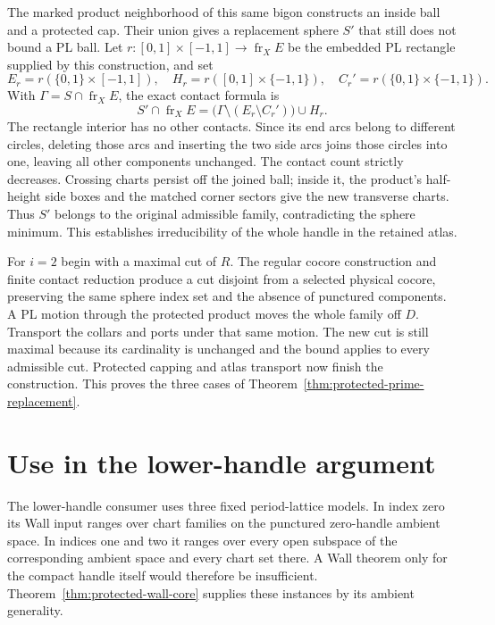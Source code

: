 The marked product neighborhood of this same bigon constructs an inside
ball and a protected cap. Their union gives a replacement sphere $S'$
that still does not bound a PL ball. Let $r:[0,1]\times[-1,1]\to
\operatorname{fr}_X E$ be the embedded PL rectangle supplied by this
construction, and set
\[
 E_r=r(\{0,1\}\times[-1,1]),\quad
 H_r=r([0,1]\times\{-1,1\}),\quad
 C_r'=r(\{0,1\}\times\{-1,1\}).
\]
With $\Gamma=S\cap\operatorname{fr}_X E$, the exact contact formula is
\[
 S'\cap\operatorname{fr}_X E
   =\bigl(\Gamma\setminus(E_r\setminus C_r')\bigr)\cup H_r.
\]
The rectangle interior has no other contacts. Since its end arcs belong
to different circles, deleting those arcs and inserting the two side
arcs joins those circles into one, leaving all other components unchanged.
The contact count strictly decreases. Crossing charts persist off the
joined ball; inside it, the product's half-height side boxes and the
matched corner sectors give the new transverse charts. Thus $S'$ belongs
to the original admissible family, contradicting the sphere minimum.
This establishes irreducibility of the whole handle in the retained atlas.

For $i=2$ begin with a maximal cut of $R$. The regular cocore construction
and finite contact reduction produce a cut disjoint from a selected
physical cocore, preserving the same sphere index set and the absence of
punctured components. A PL motion through the protected product moves the
whole family off $D$. Transport the collars and ports under that same
motion. The new cut is still maximal because its cardinality is unchanged
and the bound applies to every admissible cut. Protected capping and atlas
transport now finish the construction. This proves the three cases of
Theorem~\ref{thm:protected-prime-replacement}.

\section{Use in the lower-handle argument}
\label{sec:compact-core-contracts}

The lower-handle consumer uses three fixed period-lattice models. In index
zero its Wall input ranges over chart families on the punctured zero-handle
ambient space. In indices one and two it ranges over every open subspace
of the corresponding ambient space and every chart set there. A Wall
theorem only for the compact handle itself would therefore be insufficient.
Theorem~\ref{thm:protected-wall-core} supplies these instances by its
ambient generality.

